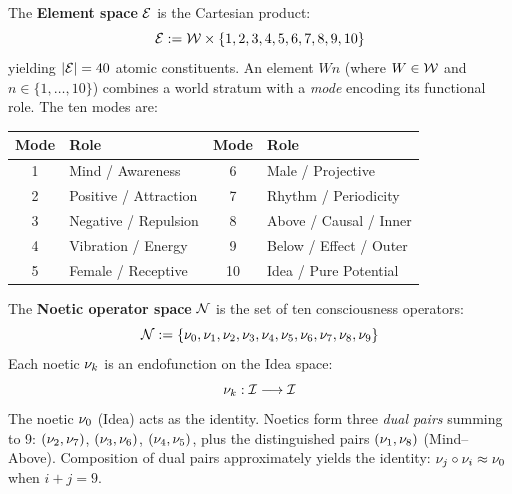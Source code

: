 \begin{definition}[Elements]
\label{def:core-elements}
The \textbf{Element space} $\mathcal{E}$ is the Cartesian product:
\[
    \mathcal{E} := \mathcal{W} \times \{1, 2, 3, 4, 5, 6, 7, 8, 9, 10\}
\]
yielding $|\mathcal{E}| = 40$ atomic constituents. An element $Wn$ (where $W \in \mathcal{W}$
and $n \in \{1, \ldots, 10\}$) combines a world stratum with a \emph{mode} encoding
its functional role. The ten modes are:
\begin{center}
\begin{tabular}{cl|cl}
\toprule
\textbf{Mode} & \textbf{Role} & \textbf{Mode} & \textbf{Role} \\
\midrule
1 & Mind / Awareness & 6 & Male / Projective \\
2 & Positive / Attraction & 7 & Rhythm / Periodicity \\
3 & Negative / Repulsion & 8 & Above / Causal / Inner \\
4 & Vibration / Energy & 9 & Below / Effect / Outer \\
5 & Female / Receptive & 10 & Idea / Pure Potential \\
\bottomrule
\end{tabular}
\end{center}
\end{definition}

\begin{definition}[Noetics]
\label{def:core-noetics}
The \textbf{Noetic operator space} $\mathcal{N}$ is the set of ten consciousness operators:
\[
    \mathcal{N} := \{\nu_{0}, \nu_{1}, \nu_{2}, \nu_{3}, \nu_{4}, \nu_{5},
                  \nu_{6}, \nu_{7}, \nu_{8}, \nu_{9}\}
\]
Each noetic $\nu_{k}$ is an endofunction on the Idea space:
\[
    \nu_{k} : \mathcal{I} \longrightarrow \mathcal{I}
\]
The noetic $\nu_{0}$ (Idea) acts as the identity. Noetics form three \emph{dual pairs}
summing to 9: $(\nu_{2}, \nu_{7})$, $(\nu_{3}, \nu_{6})$, $(\nu_{4}, \nu_{5})$,
plus the distinguished pairs $(\nu_{1}, \nu_{8})$ (Mind--Above). Composition of
dual pairs approximately yields the identity: $\nu_{j} \circ \nu_{i} \approx \nu_{0}$
when $i + j = 9$.
\end{definition}

